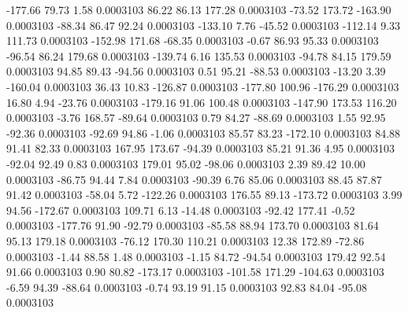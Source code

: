      -177.66       79.73        1.58     0.0003103
       86.22       86.13      177.28     0.0003103
      -73.52      173.72     -163.90     0.0003103
      -88.34       86.47       92.24     0.0003103
     -133.10        7.76      -45.52     0.0003103
     -112.14        9.33      111.73     0.0003103
     -152.98      171.68      -68.35     0.0003103
       -0.67       86.93       95.33     0.0003103
      -96.54       86.24      179.68     0.0003103
     -139.74        6.16      135.53     0.0003103
      -94.78       84.15      179.59     0.0003103
       94.85       89.43      -94.56     0.0003103
        0.51       95.21      -88.53     0.0003103
      -13.20        3.39     -160.04     0.0003103
       36.43       10.83     -126.87     0.0003103
     -177.80      100.96     -176.29     0.0003103
       16.80        4.94      -23.76     0.0003103
     -179.16       91.06      100.48     0.0003103
     -147.90      173.53      116.20     0.0003103
       -3.76      168.57      -89.64     0.0003103
        0.79       84.27      -88.69     0.0003103
        1.55       92.95      -92.36     0.0003103
      -92.69       94.86       -1.06     0.0003103
       85.57       83.23     -172.10     0.0003103
       84.88       91.41       82.33     0.0003103
      167.95      173.67      -94.39     0.0003103
       85.21       91.36        4.95     0.0003103
      -92.04       92.49        0.83     0.0003103
      179.01       95.02      -98.06     0.0003103
        2.39       89.42       10.00     0.0003103
      -86.75       94.44        7.84     0.0003103
      -90.39        6.76       85.06     0.0003103
       88.45       87.87       91.42     0.0003103
      -58.04        5.72     -122.26     0.0003103
      176.55       89.13     -173.72     0.0003103
        3.99       94.56     -172.67     0.0003103
      109.71        6.13      -14.48     0.0003103
      -92.42      177.41       -0.52     0.0003103
     -177.76       91.90      -92.79     0.0003103
      -85.58       88.94      173.70     0.0003103
       81.64       95.13      179.18     0.0003103
      -76.12      170.30      110.21     0.0003103
       12.38      172.89      -72.86     0.0003103
       -1.44       88.58        1.48     0.0003103
       -1.15       84.72      -94.54     0.0003103
      179.42       92.54       91.66     0.0003103
        0.90       80.82     -173.17     0.0003103
     -101.58      171.29     -104.63     0.0003103
       -6.59       94.39      -88.64     0.0003103
       -0.74       93.19       91.15     0.0003103
       92.83       84.04      -95.08     0.0003103
